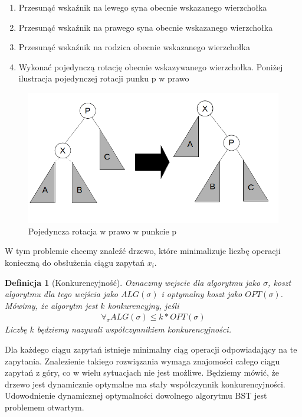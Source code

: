 \documentclass[declaration,shortabstract]{iithesis}
\newcounter{thm}[section]
\theoremstyle{thm}
\newtheorem{definition}[thm]{Definicja}
\theoremstyle{remark}
\theoremstyle{plain}
\theoremstyle{plain}
\theoremstyle{plain}
\begin{document}
\begin{enumerate}   

\item {Przesunąć wskaźnik na lewego syna obecnie wskazanego wierzchołka}   

\item {Przesunąć wskaźnik na prawego syna obecnie wskazanego wierzchołka}   

\item {Przesunąć wskaźnik na rodzica obecnie wskazanego wierzchołka}   

\item {Wykonać pojedynczą rotację obecnie wskazywanego wierzchołka. Poniżej ilustracja pojedynczej rotacji punku p w prawo}    

\end{enumerate}   
\begin{figure}[H]
\centering    
\includegraphics[scale = 0.5]{zig.png}  
\caption{Pojedyncza rotacja w prawo w punkcie p} 
 \label{fig:1} 
\end{figure}  

 
W tym problemie chcemy znaleźć drzewo, które minimalizuje liczbę operacji konieczną do obsłużenia ciągu zapytań \(x_i\). 

\begin{definition}[Konkurencyjność]
Oznaczmy wejscie dla algorytmu jako \(\sigma\), koszt algorytmu dla tego wejścia jako \(ALG(\sigma)\) i optymalny koszt jako \(OPT(\sigma)\).
Mówimy, że algorytm jest $k$ konkurencyjny, jeśli
\begin{align*}
\forall_{\sigma} ALG(\sigma) \leq k*OPT(\sigma)
\end{align*}
Liczbę $k$ będziemy nazywali współczynnikiem konkurencyjności.
\end{definition}  

Dla każdego ciągu zapytań istnieje minimalny ciąg operacji odpowiadający na te zapytania. Znalezienie takiego rozwiązania wymaga znajomości całego ciągu zapytań z góry, co w wielu sytuacjach nie jest możliwe. Będziemy mówić, że drzewo jest dynamicznie optymalne ma stały współczynnik konkurencyjności. Udowodnienie dynamicznej optymalności dowolnego algorytmu BST jest problemem otwartym.   
\end{document}
